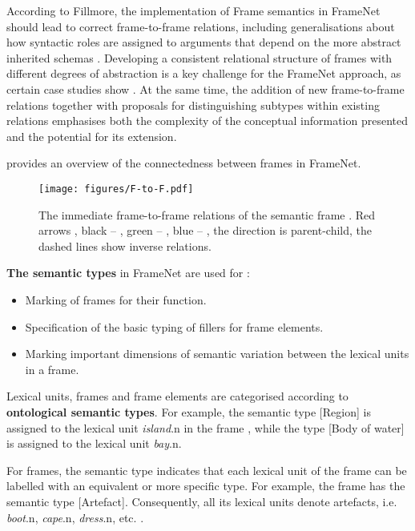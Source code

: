 \documentclass[output=paper,colorlinks,citecolor=brown]{langscibook}
\begin{document}
According to Fillmore, the implementation of Frame semantics in FrameNet should lead to correct frame-to-frame relations, including generalisations about how syntactic roles are assigned to arguments that depend on the more abstract inherited schemas \citep[157]{fillmore2007valency}. Developing a consistent relational structure of frames with different degrees of abstraction is a key challenge for the FrameNet approach, as certain case studies show \citep[153]{osswald2014jr}. At the same time, the addition of new frame-to-frame relations together with proposals for distinguishing subtypes within existing relations \citep[12--19]{sikos2018framenets} emphasises both the complexity of the conceptual information presented and the potential for its extension.

 provides an overview of the connectedness between frames in FrameNet.

\begin{figure}
  \texttt{[image: figures/F-to-F.pdf]}
  \caption{The immediate frame-to-frame relations of the semantic frame . Red arrows , black --  , green -- , blue -- , the direction is parent-child, the dashed lines show inverse relations.
  }
  \label{fig:F-to-FR}
\end{figure}

\newpage
\textbf{The semantic types} in FrameNet are used for \citep[86]{Ruppenhofer2016}:

\begin{itemize}
 \item{Marking of frames for their function}.
    \item{Specification of the basic typing of fillers for frame elements.}
 \item{Marking important dimensions of semantic variation between the lexical units in a frame.}
\end{itemize}

Lexical units, frames and frame elements are categorised according to \textbf{ontological semantic types}. For example, the semantic type [Region] is assigned to the lexical unit \emph{island}.n in the frame , while the type [Body of water] is assigned to the lexical unit  \emph{bay}.n.

For frames, the semantic type indicates that each lexical unit of the frame can be labelled with an equivalent or more specific type. For example, the frame  has the semantic type [Artefact]. Consequently, all its lexical units denote artefacts, i.e. \textit{boot}.n, \textit{cape}.n, \textit{dress}.n, etc. \citep[422--423]{Lonneker-RodmanB09}.
\end{document}
